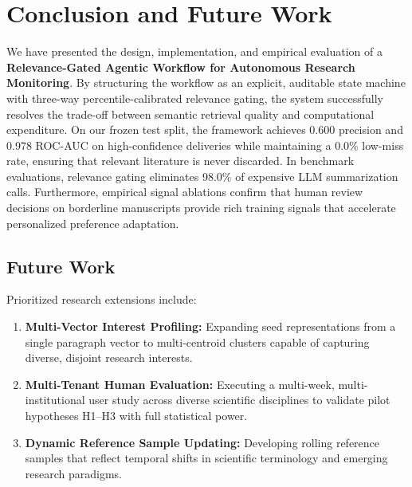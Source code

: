 \section{Conclusion and Future Work}
\label{sec:conclusion}

We have presented the design, implementation, and empirical evaluation of a \textbf{Relevance-Gated Agentic Workflow for Autonomous Research Monitoring}. By structuring the workflow as an explicit, auditable state machine with three-way percentile-calibrated relevance gating, the system successfully resolves the trade-off between semantic retrieval quality and computational expenditure. On our frozen test split, the framework achieves 0.600 precision and 0.978 ROC-AUC on high-confidence deliveries while maintaining a 0.0\% low-miss rate, ensuring that relevant literature is never discarded. In benchmark evaluations, relevance gating eliminates 98.0\% of expensive LLM summarization calls. Furthermore, empirical signal ablations confirm that human review decisions on borderline manuscripts provide rich training signals that accelerate personalized preference adaptation.

\subsection{Future Work}
\label{sec:future_work}

Prioritized research extensions include:
\begin{enumerate}
    \item \textbf{Multi-Vector Interest Profiling:} Expanding seed representations from a single paragraph vector to multi-centroid clusters capable of capturing diverse, disjoint research interests.
    \item \textbf{Multi-Tenant Human Evaluation:} Executing a multi-week, multi-institutional user study across diverse scientific disciplines to validate pilot hypotheses H1--H3 with full statistical power.
    \item \textbf{Dynamic Reference Sample Updating:} Developing rolling reference samples that reflect temporal shifts in scientific terminology and emerging research paradigms.
\end{enumerate}
